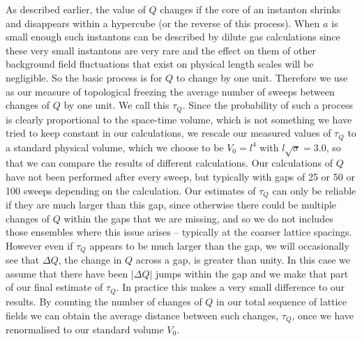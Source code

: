 \documentclass[12pt]{article}
\begin{document}
As described earlier, the value of $Q$ changes if the core of an instanton shrinks and
disappears within a hypercube (or the reverse of this process). When $a$ is small enough
such instantons can be described by dilute gas calculations since these very small
instantons are very rare and the effect on them of other background field fluctuations that exist on
physical length scales will be negligible. So the basic process is for $Q$ to change by one unit.
Therefore we use as our measure of topological freezing the average number of sweeps  between
changes of $Q$ by one unit. We call this $\tau_Q$. Since the probability of such a process
is clearly proportional to the space-time volume, which is not something we have tried to keep
constant in our calculations, we rescale our measured values of $\tau_Q$ to a standard physical
volume, which we choose to be $V_0=l^4$ with $l\surd\sigma=3.0$,
so that we can compare the results of different calculations.
Our calculations of $Q$ have not been performed after every sweep, but typically with
gaps of  25 or 50 or 100 sweeps depending on the calculation. Our estimates of $\tau_Q$ can
only be reliable if they are much larger than this gap, since otherwise there could be multiple
changes of $Q$ within the gaps that we are missing, and so we do not includes those ensembles
where this issue arises -- typically at the coarser lattice spacings. However even if $\tau_Q$
appears to be much larger than the gap, we will occasionally see that $\Delta Q$, the change in
$Q$ across a gap, is greater than unity. In this case we assume that there have been $|\Delta Q|$
jumps within the gap and we make that part of our final estimate of  $\tau_Q$. In practice
this makes a very small difference to our results. By counting the number of changes of $Q$ in our
total sequence of lattice fields we can obtain the average distance between such changes, $\tau_Q$,
once we have renormalised to our standard volume $V_0$.
\end{document}
